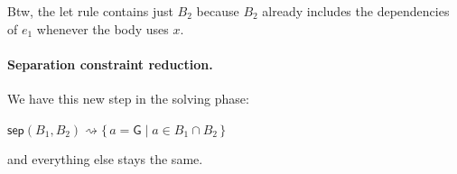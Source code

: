 \documentclass[manuscript,review,nonacm]{acmart}
\newcommand{\G}{\mathsf{G}}
\newcommand{\real}[1]{\mathsf{real}^{#1}}
\newcommand{\bool}{\mathsf{bool}}
\begin{document}

Btw, the let rule contains just $B_2$ because $B_2$ already includes the dependencies of $e_1$ whenever the body uses $x$.


\paragraph{Separation constraint reduction.}
We have this new step in the solving phase:

$\mathsf{sep}(B_1, B_2) \rightsquigarrow \{\, a = \G \mid a \in B_1 \cap B_2 \,\}$

and everything else stays the same.

\newpage
\end{document}
